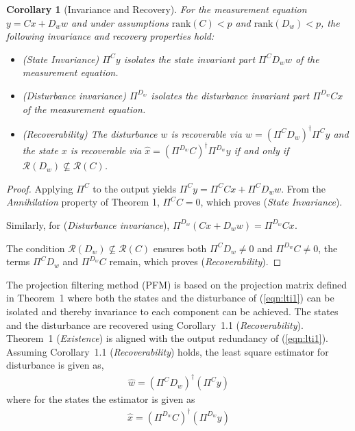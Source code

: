 \documentclass[pdflatex,sn-mathphys-num]{sn-jnl}%
\theoremstyle{thmstyleone}%
\newtheorem{corollary}{Corollary}
\theoremstyle{thmstyletwo}%
\theoremstyle{thmstylethree}%
\begin{document}
\begin{corollary}[Invariance and Recovery]
For the measurement equation $y = Cx + D_w w$ and under assumptions $\mathrm{rank}(C) < p$ and $\mathrm{rank}(D_w) < p$, the following invariance and recovery properties hold:
\begin{itemize}
    \item (\textit{State Invariance}) $\Pi^C y$ isolates the state invariant part $\Pi^C D_w w$ of the measurement equation. 
    \item (\textit{Disturbance invariance}) $\Pi^{D_w}$ isolates the disturbance invariant part $\Pi^{D_w} C x$ of the measurement equation.
    \item (\textit{Recoverability}) The disturbance $w$ is recoverable via $\hat{w} = (\Pi^C D_w)^\dagger \Pi^C y$ and the state $x$ is recoverable via $\hat{x} = (\Pi^{D_w}C)^\dagger \Pi^{D_w} y$ if and only if $\mathcal{R}(D_w) \not\subseteq \mathcal{R}(C)$.
\end{itemize}
\end{corollary}

\begin{proof}
    Applying $\Pi^C$ to the output yields $\Pi^C y = \Pi^C Cx + \Pi^C D_w w$. From the \textit{Annihilation} property of Theorem 1, $\Pi^C C = 0$, which proves (\textit{State Invariance}). 
    
    Similarly, for (\textit{Disturbance invariance}), $\Pi^{D_w} (Cx + D_w w)=\Pi^{D_w} Cx$.
    
    The condition $\mathcal{R}(D_w) \not\subseteq \mathcal{R}(C)$ ensures both $\Pi^C D_w \neq 0$ and $\Pi^{D_w}C\neq 0$, the terms $\Pi^C D_w$ and $\Pi^{D_w} C$ remain, which proves (\textit{Recoverability}).
\end{proof}


The projection filtering method (PFM) is based on the projection matrix defined in Theorem~1 where both the states and the disturbance of (\ref{eqn:lti1}) can be isolated and thereby invariance to each component can be achieved. The states and the disturbance are recovered using Corollary~1.1 (\textit{Recoverability}). Theorem~1 (\textit{Existence}) is aligned with the output redundancy of (\ref{eqn:lti1}). Assuming Corollary~1.1 (\textit{Recoverability}) holds, the least square estimator for disturbance is given as,
\begin{gather}
    \hat{w}=(\Pi^C D_w)^\dagger(\Pi^C y)\label{eqn:filtering_w}
\end{gather}
where for the states the estimator is given as
\begin{gather}
    \hat{x}=(\Pi^{D_w}C)^\dagger(\Pi^{D_w} y)\label{eqn:filtering_x}
\end{gather}
\end{document}
